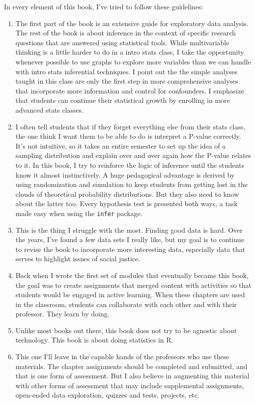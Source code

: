 \documentclass[
]{book}
\providecommand{\tightlist}{%
  \setlength{\itemsep}{0pt}\setlength{\parskip}{0pt}}
\begin{document}
In every element of this book, I've tried to follow these guidelines:

\begin{enumerate}
\def\labelenumi{\arabic{enumi}.}
\tightlist
\item
  The first part of the book is an extensive guide for exploratory data analysis. The rest of the book is about inference in the context of specific research questions that are answered using statistical tools. While multivariable thinking is a little harder to do in a intro stats class, I take the opportunity whenever possible to use graphs to explore more variables than we can handle with intro stats inferential techniques. I point out the the simple analyses taught in this class are only the first step in more comprehensive analyses that incorporate more information and control for confounders. I emphasize that students can continue their statistical growth by enrolling in more advanced stats classes.
\item
  I often tell students that if they forget everything else from their stats class, the one think I want them to be able to do is interpret a P-value correctly. It's not intuitive, so it takes an entire semester to set up the idea of a sampling distribution and explain over and over again how the P-value relates to it. In this book, I try to reinforce the logic of inference until the students know it almost instinctively. A huge pedagogical advantage is derived by using randomization and simulation to keep students from getting lost in the clouds of theoretical probability distributions. But they also need to know about the latter too. Every hypothesis test is presented both ways, a task made easy when using the \texttt{infer} package.
\item
  This is the thing I struggle with the most. Finding good data is hard. Over the years, I've found a few data sets I really like, but my goal is to continue to revise the book to incorporate more interesting data, especially data that serves to highlight issues of social justice.
\item
  Back when I wrote the first set of modules that eventually became this book, the goal was to create assignments that merged content with activities so that students would be engaged in active learning. When these chapters are used in the classroom, students can collaborate with each other and with their professor. They learn by doing.
\item
  Unlike most books out there, this book does not try to be agnostic about technology. This book is about doing statistics in R.
\item
  This one I'll leave in the capable hands of the professors who use these materials. The chapter assignments should be completed and submitted, and that is one form of assessment. But I also believe in augmenting this material with other forms of assessment that may include supplemental assignments, open-ended data exploration, quizzes and tests, projects, etc.
\end{enumerate}
\end{document}
